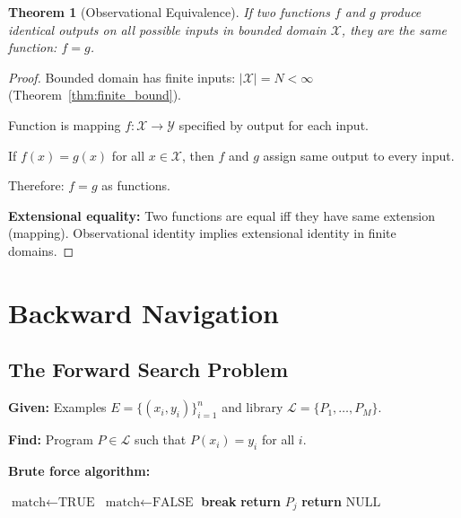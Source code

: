 \documentclass[twocolumn,10pt]{article}
\newtheorem{theorem}{Theorem}[section]
\theoremstyle{definition}
\theoremstyle{remark}
\begin{document}
\begin{theorem}[Observational Equivalence]
\label{thm:observational_equiv}
If two functions $f$ and $g$ produce identical outputs on all possible inputs in bounded domain $\mathcal{X}$, they are the same function: $f = g$.
\end{theorem}

\begin{proof}
Bounded domain has finite inputs: $|\mathcal{X}| = N < \infty$ (Theorem~\ref{thm:finite_bound}).

Function is mapping $f: \mathcal{X} \to \mathcal{Y}$ specified by output for each input.

If $f(x) = g(x)$ for all $x \in \mathcal{X}$, then $f$ and $g$ assign same output to every input.

Therefore: $f = g$ as functions.

\vspace{0.2cm}
\noindent\textbf{Extensional equality:} Two functions are equal iff they have same extension (mapping). Observational identity implies extensional identity in finite domains.
\end{proof}

\section{Backward Navigation}
\label{sec:backward_nav}

\subsection{The Forward Search Problem}

\textbf{Given:} Examples $E = \{(x_i, y_i)\}_{i=1}^n$ and library $\mathcal{L} = \{P_1, \ldots, P_M\}$.

\textbf{Find:} Program $P \in \mathcal{L}$ such that $P(x_i) = y_i$ for all $i$.

\vspace{0.2cm}
\noindent\textbf{Brute force algorithm:}
\begin{algorithm}
\caption{Forward Search}
\begin{algorithmic}[1]
  \STATE $\text{match} \leftarrow \text{TRUE}$
      \STATE $\text{match} \leftarrow \text{FALSE}$
      \STATE \textbf{break}
    \ENDIF
  \ENDFOR
    \STATE \textbf{return} $P_j$
  \ENDIF
\ENDFOR
\STATE \textbf{return} $\text{NULL}$
\end{algorithmic}
\end{algorithm}
\end{document}
